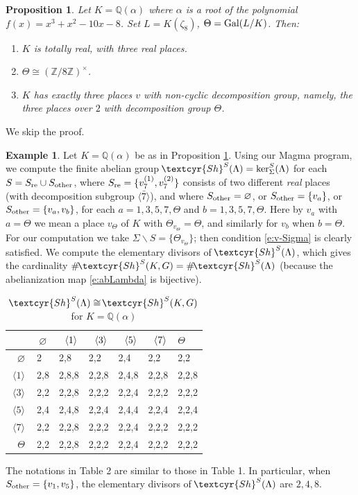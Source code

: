 \documentclass[11pt]{amsart}
\renewcommand{\mathbb}{\mathds}
\newcommand{\Sha}{{\!\textcyr{Sh}}}
\theoremstyle{plain}
\newtheorem{proposition}[theorem]{Proposition}
\theoremstyle{definition}
\newtheorem{example}[theorem]{Example}
\newcommand{\Q}{{\mathbb Q}}
\newcommand{\Z}{{\mathbb Z}}
\newcommand{\Gal}{{\rm Gal}}
\newcommand{\hs}{\kern 0.8pt}
\newcommand{\la}{\langle}
\newcommand{\ra}{\rangle}
\newcommand{\vn}{{\varnothing}}
\newcommand{\re}{{\rm re}}
\begin{document}
\newcommand{\other}{{\rm other}}
\begin{proposition}\label{p:cubic}
Let $K=\Q(\alpha)$ where $\alpha$ is a root of the polynomial $f(x)=x^3+x^2-10x-8$.
Set $L=K(\zeta_8)$, $\Theta=\Gal(L/K)$. Then:
\begin{enumerate}
\item $K$ is totally real, with three real places.
\item $\Theta\cong(\Z/8\Z)^\times$.
\item $K$ has exactly three places $v$ with non-cyclic decomposition group,
namely, the three places over $2$ with decomposition group $\Theta$.
\end{enumerate}
\end{proposition}

We skip the proof.

\begin{example}\label{ex:Theta}
Let $K=\Q(\alpha)$ be as in Proposition \ref{p:cubic}.
Using our Magma program, we compute
the finite abelian group $\Sha^S(\Lambda)=\ker_\Sigma^S(\Lambda)$
for each $S=S_\re\cup S_\other$, where $S_\re=\{v_7^{(1)},v_7^{(2)}\}$
consists of two different {\em real} places
(with decomposition subgroup $\la\bar 7\ra$), and where
$S_\other=\varnothing$, or $S_\other=\{v_a\}$, or  $S_\other=\{v_a,v_b\}$,
for each $a=1,3,5,7,\Theta$ and $b=1,3,5,7,\Theta$.
Here by $v_a$ with $a=\Theta$
we mean a place $v_\Theta$ of $K$ with $\Theta_{v_\Theta}=\Theta$,
and similarly for $v_b$ when $b=\Theta$.
For our computation we take $\Sigma\smallsetminus S=\{\Theta_{v_\Theta}\}$;
then condition \eqref{e:v-Sigma} is clearly satisfied.
We compute the elementary divisors of $\Sha^S(\Lambda)$,
which gives the cardinality $\#\Sha^S(K,G)=\#\Sha^S(\Lambda)$
(because the abelianization map \eqref{e:abLambda} is bijective).



\begin{longtable}{|r|l|l|l|l|l|l|}
\caption{$\Sha^S(\Lambda)\cong\Sha^S(K,G)$ for $K=\Q(\alpha)$}
\endfirsthead
\hline
\endhead
\hline
\endfoot
\endlastfoot

\hline
    &$\ \vn$    & \ $\la1\ra\hs$ &\ $\la3\ra\hs$ &\ $\la5\ra\hs$ &\ $\la7\ra\hs$ & $\Theta$
    \\
\hline
$\vn\ $   &   2    &   2,8   &  2,2   &   2,4   & 2,2 & 2,2
\\
\hline
$\ \la 1 \ra\ $
& 2,8 & 2,8,8 & 2,2,8 & 2,4,8 & 2,2,8 & 2,2,8
\\
\hline
$\ \la 3 \ra\ $
& 2,2 & 2,2,8  & 2,2,2 & 2,2,4 & 2,2,2 & 2,2,2
\\
\hline
$\ \la 5 \ra\ $
& 2,4 & 2,4,8 & 2,2,4 & 2,4,4  & 2,2,4 & 2,2,4
\\
\hline
$\ \la 7 \ra\ $
& 2,2 & 2,2,8 & 2,2,2 & 2,2,4 & 2,2,2 & 2,2,2
\\
\hline
$ \Theta\ $
& 2,2  & 2,2,8 & 2,2,2 & 2,2,4 & 2,2,2 & 2,2,2
\\
\hline
\end{longtable}

The notations in Table 2 are similar to those in Table 1.
In particular, when $S_\other=\{v_1,v_5\}$,
the elementary divisors of $\Sha^S(\Lambda)$ are $2,4,8$.

\end{example}
\end{document}
